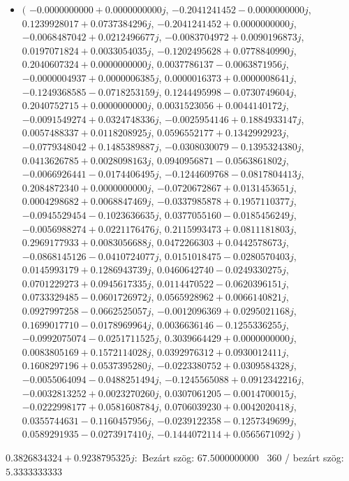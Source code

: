 \documentclass[14pt,a4paper]{article}
\begin{document}
\begin{itemize}
\item
$\big($
$-0.0000000000+0.0000000000j$, $-0.2041241452-0.0000000000j$, $0.1239928017+0.0737384296j$, $-0.2041241452+0.0000000000j$, $-0.0068487042+0.0212496677j$, $-0.0083704972+0.0090196873j$, $0.0197071824+0.0033054035j$, $-0.1202495628+0.0778840990j$, $0.2040607324+0.0000000000j$, $0.0037786137-0.0063871956j$, $-0.0000004937+0.0000006385j$, $0.0000016373+0.0000008641j$, $-0.1249368585-0.0718253159j$, $0.1244495998-0.0730749604j$, $0.2040752715+0.0000000000j$, $0.0031523056+0.0044140172j$, $-0.0091549274+0.0324748336j$, $-0.0025954146+0.1884933147j$, $0.0057488337+0.0118208925j$, $0.0596552177+0.1342992923j$, $-0.0779348042+0.1485389887j$, $-0.0308030079-0.1395324380j$, $0.0413626785+0.0028098163j$, $0.0940956871-0.0563861802j$, $-0.0066926441-0.0174406495j$, $-0.1244609768-0.0817804413j$, $0.2084872340+0.0000000000j$, $-0.0720672867+0.0131453651j$, $0.0004298682+0.0068847469j$, $-0.0337985878+0.1957110377j$, $-0.0945529454-0.1023636635j$, $0.0377055160-0.0185456249j$, $-0.0056988274+0.0221176476j$, $0.2115993473+0.0811181803j$, $0.2969177933+0.0083056688j$, $0.0472266303+0.0442578673j$, $-0.0868145126-0.0410724077j$, $0.0151018475-0.0280570403j$, $0.0145993179+0.1286943739j$, $0.0460642740-0.0249330275j$, $0.0701229273+0.0945617335j$, $0.0114470522-0.0620396151j$, $0.0733329485-0.0601726972j$, $0.0565928962+0.0066140821j$, $0.0927997258-0.0662525057j$, $-0.0012096369+0.0295021168j$, $0.1699017710-0.0178969964j$, $0.0036636146-0.1255336255j$, $-0.0992075074-0.0251711525j$, $0.3039664429+0.0000000000j$, $0.0083805169+0.1572114028j$, $0.0392976312+0.0930012411j$, $0.1608297196+0.0537395280j$, $-0.0223380752+0.0309584328j$, $-0.0055064094-0.0488251494j$, $-0.1245565088+0.0912342216j$, $-0.0032813252+0.0023270260j$, $0.0307061205-0.0014700015j$, $-0.0222998177+0.0581608784j$, $0.0706039230+0.0042020418j$, $0.0355744631-0.1160457956j$, $-0.0239122358-0.1257349699j$, $0.0589291935-0.0273917410j$, $-0.1444072114+0.0565671092j$
$\big)$
\end{itemize}
$0.3826834324+0.9238795325j$:\
Bezárt szög: $67.5000000000$ \
360 / bezárt szög: $5.3333333333$\
\end{document}
